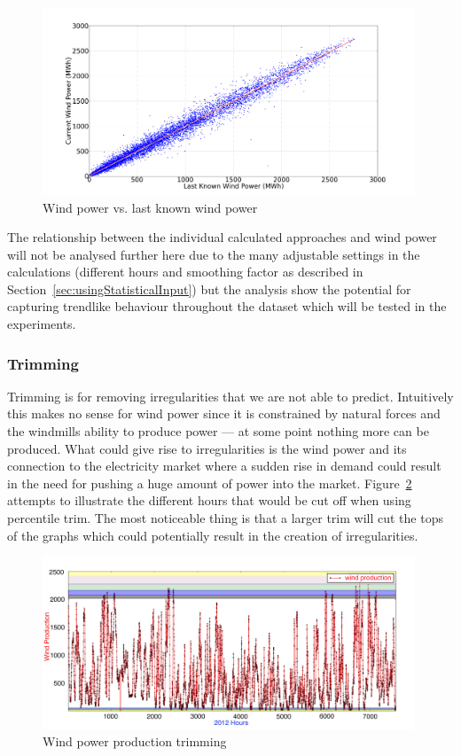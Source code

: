 \begin{figure}[ht!]
\centering
\includegraphics[width=0.99\textwidth]{billeder/windProductionVsLastWindProduction.png}
\caption{Wind power vs. last known wind power}
\label{fig:windProductionVsLastWindProduction}
\end{figure}

\noindent The relationship between the individual calculated approaches and wind power will not be analysed further here due to the many adjustable settings in the calculations (different hours and smoothing factor as described in Section~\ref{sec:usingStatisticalInput}) but the analysis show the potential for capturing trendlike behaviour throughout the dataset which will be tested in the experiments.

\subsubsection{Trimming} 
Trimming is for removing irregularities that we are not able to predict. Intuitively this makes no sense for wind power since it is constrained by natural forces and the windmills ability to produce power --- at some point nothing more can be produced. What could give rise to irregularities is the wind power and its connection to the electricity market where a sudden rise in demand could result in the need for pushing a huge amount of power into the market. Figure~\ref{fig:windProductionTrimming} attempts to illustrate the different hours that would be cut off when using percentile trim. The most noticeable thing is that a larger trim will cut the tops of the graphs which could potentially result in the creation of irregularities. 

\begin{figure}[ht!]
\centering
\includegraphics[width=0.99\textwidth]{billeder/windProductionTrimming.jpg}
\caption{Wind power production trimming}
\label{fig:windProductionTrimming}
\end{figure}

